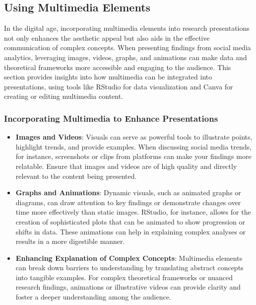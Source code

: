 \documentclass[
]{book}
\begin{document}
\hypertarget{using-multimedia-elements}{%
\subsection*{Using Multimedia Elements}\label{using-multimedia-elements}}

In the digital age, incorporating multimedia elements into research presentations not only enhances the aesthetic appeal but also aids in the effective communication of complex concepts. When presenting findings from social media analytics, leveraging images, videos, graphs, and animations can make data and theoretical frameworks more accessible and engaging to the audience. This section provides insights into how multimedia can be integrated into presentations, using tools like RStudio for data visualization and Canva for creating or editing multimedia content.

\hypertarget{incorporating-multimedia-to-enhance-presentations}{%
\subsubsection*{Incorporating Multimedia to Enhance Presentations}\label{incorporating-multimedia-to-enhance-presentations}}

\begin{itemize}
\item
  \textbf{Images and Videos}: Visuals can serve as powerful tools to illustrate points, highlight trends, and provide examples. When discussing social media trends, for instance, screenshots or clips from platforms can make your findings more relatable. Ensure that images and videos are of high quality and directly relevant to the content being presented.
\item
  \textbf{Graphs and Animations}: Dynamic visuals, such as animated graphs or diagrams, can draw attention to key findings or demonstrate changes over time more effectively than static images. RStudio, for instance, allows for the creation of sophisticated plots that can be animated to show progression or shifts in data. These animations can help in explaining complex analyses or results in a more digestible manner.
\item
  \textbf{Enhancing Explanation of Complex Concepts}: Multimedia elements can break down barriers to understanding by translating abstract concepts into tangible examples. For complex theoretical frameworks or nuanced research findings, animations or illustrative videos can provide clarity and foster a deeper understanding among the audience.
\end{itemize}
\end{document}
